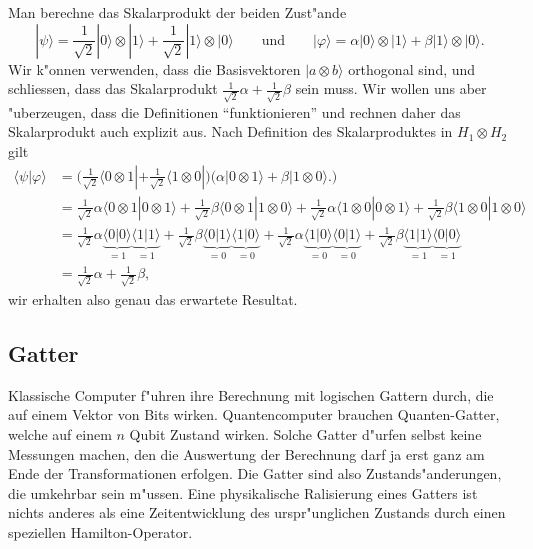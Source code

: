 \begin{beispiel}
Man berechne das Skalarprodukt der beiden Zust"ande
\[
|\psi\rangle
=
\frac1{\sqrt{2}} |0\rangle\otimes|1\rangle
+
\frac1{\sqrt{2}} |1\rangle\otimes|0\rangle
\qquad
\text{und}
\qquad
|\varphi\rangle
=
\alpha |0\rangle\otimes|1\rangle
+
\beta |1\rangle\otimes|0\rangle.
\]
Wir k"onnen verwenden, dass die Basisvektoren $|a\otimes b\rangle$ orthogonal
sind, und schliessen, dass das Skalarprodukt
$\frac1{\sqrt{2}}\alpha + \frac1{\sqrt{2}}\beta$ sein muss.
Wir wollen uns aber "uberzeugen, dass die Definitionen ``funktionieren''
und rechnen daher das Skalarprodukt auch explizit aus.
Nach Definition des Skalarproduktes in $H_1\otimes H_2$ gilt
\begin{align*}
\langle\psi|\varphi\rangle
&=
\biggl(
\frac1{\sqrt{2}} \langle 0 \otimes 1|
+
\frac1{\sqrt{2}} \langle 1\otimes0|
\biggr)
\biggl(
\alpha |0\otimes 1\rangle
+
\beta |1\otimes 0\rangle.
\biggr)
\\
&=
\frac1{\sqrt{2}} \alpha\langle 0\otimes 1|0\otimes 1\rangle
+
\frac1{\sqrt{2}} \beta \langle 0\otimes 1|1\otimes 0\rangle
+
\frac1{\sqrt{2}} \alpha\langle 1\otimes 0|0\otimes 1\rangle
+
\frac1{\sqrt{2}} \beta \langle 1\otimes 0|1\otimes 0\rangle
\\
&=
\frac1{\sqrt{2}} \alpha\underbrace{\langle 0|0\rangle}_{=1} \underbrace{\langle 1|1\rangle}_{=1}
+
\frac1{\sqrt{2}} \beta \underbrace{\langle 0|1\rangle}_{=0} \underbrace{\langle 1|0\rangle}_{=0}
+
\frac1{\sqrt{2}} \alpha\underbrace{\langle 1|0\rangle}_{=0} \underbrace{\langle 0|1\rangle}_{=0}
+
\frac1{\sqrt{2}} \beta \underbrace{\langle 1|1\rangle}_{=1} \underbrace{\langle 0|0\rangle}_{=1}
\\
&=
\frac1{\sqrt{2}}\alpha + \frac1{\sqrt{2}}\beta,
\end{align*}
wir erhalten also genau das erwartete Resultat.
\end{beispiel}

\subsection{Gatter}
Klassische Computer f"uhren ihre Berechnung mit logischen Gattern durch,
die auf einem Vektor von Bits wirken.
Quantencomputer brauchen Quanten-Gatter, welche auf einem
$n$ Qubit Zustand wirken.
Solche Gatter d"urfen selbst keine Messungen machen, den die
Auswertung der Berechnung darf ja erst ganz am Ende der
Transformationen erfolgen.
Die Gatter sind also Zustands"anderungen, die umkehrbar sein m"ussen.
Eine physikalische Ralisierung eines Gatters ist nichts anderes
als eine Zeitentwicklung des urspr"unglichen Zustands durch einen
speziellen Hamilton-Operator.

